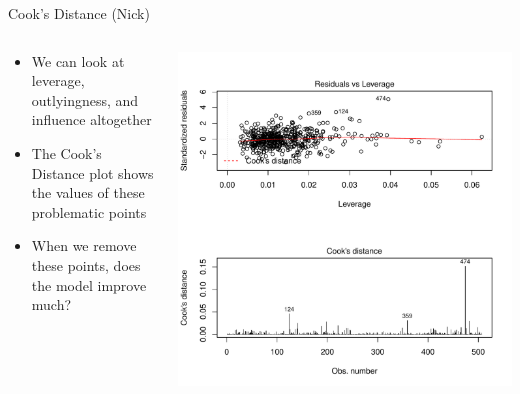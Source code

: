\documentclass[table]{beamer}\usepackage[]{graphicx}\usepackage[]{color}
\makeatletter
\def\maxwidth{ %
  \ifdim\Gin@nat@width>\linewidth
    \linewidth
  \else
    \Gin@nat@width
  \fi
}
\newenvironment{knitrout}{}{} %
\makeatother
\begin{document}
\begin{frame} {Cook's Distance (Nick)}
\begin{columns}[t]
\begin{column}[c]{5cm}

\begin{itemize}
  \item We can look at leverage, outlyingness, and influence altogether
  \item The Cook's Distance plot shows the values of these problematic points
  \item When we remove these points, does the model improve much?
\end{itemize}
\end{column}

\begin{column}[c]{7cm}

\begin{knitrout}
\color{fgcolor}
\includegraphics[width=\maxwidth]{figure/unnamed-chunk-1} 

\end{knitrout}

\end{column}
\end{columns}
\end{frame}
\end{document}
